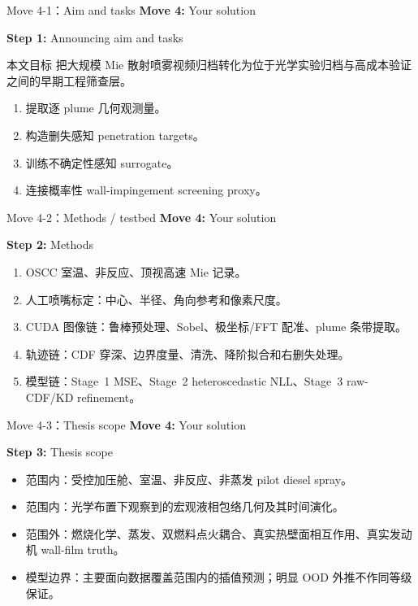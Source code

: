 \documentclass[aspectratio=169,11pt]{beamer}
\newcommand{\movetag}[2]{\textbf{Move #1:} #2}
\newcommand{\steptag}[2]{\textbf{Step #1:} #2}
\begin{document}
\begin{frame}{Move 4-1：Aim and tasks}
\footnotesize
\movetag{4}{Your solution}

\vspace{0.5em}
\steptag{1}{Announcing aim and tasks}

\vspace{0.5em}
\begin{block}{本文目标}
把大规模 Mie 散射喷雾视频归档转化为位于光学实验归档与高成本验证之间的早期工程筛查层。
\end{block}

\vspace{0.3em}
\begin{enumerate}
  \item 提取逐 plume 几何观测量。
  \item 构造删失感知 penetration targets。
  \item 训练不确定性感知 surrogate。
  \item 连接概率性 wall-impingement screening proxy。
\end{enumerate}
\end{frame}

\begin{frame}{Move 4-2：Methods / testbed}
\footnotesize
\movetag{4}{Your solution}

\vspace{0.5em}
\steptag{2}{Methods}

\vspace{0.5em}
\begin{enumerate}
  \item OSCC 室温、非反应、顶视高速 Mie 记录。
  \item 人工喷嘴标定：中心、半径、角向参考和像素尺度。
  \item CUDA 图像链：鲁棒预处理、Sobel、极坐标/FFT 配准、plume 条带提取。
  \item 轨迹链：CDF 穿深、边界度量、清洗、降阶拟合和右删失处理。
  \item 模型链：Stage~1 MSE、Stage~2 heteroscedastic NLL、Stage~3 raw-CDF/KD refinement。
\end{enumerate}
\end{frame}

\begin{frame}{Move 4-3：Thesis scope}
\small
\movetag{4}{Your solution}

\vspace{0.5em}
\steptag{3}{Thesis scope}

\vspace{0.8em}
\begin{itemize}
  \item 范围内：受控加压舱、室温、非反应、非蒸发 pilot diesel spray。
  \item 范围内：光学布置下观察到的宏观液相包络几何及其时间演化。
  \item 范围外：燃烧化学、蒸发、双燃料点火耦合、真实热壁面相互作用、真实发动机 wall-film truth。
  \item 模型边界：主要面向数据覆盖范围内的插值预测；明显 OOD 外推不作同等级保证。
\end{itemize}
\end{frame}
\end{document}

